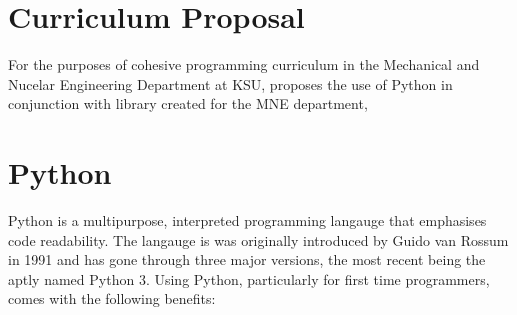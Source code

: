 \section{Curriculum Proposal}

For the purposes of cohesive programming curriculum in the Mechanical and Nucelar Engineering Department 
at KSU, proposes the use of Python in conjunction with library created for the MNE department, 

\section{Python}

Python is a multipurpose, interpreted programming langauge that emphasises code readability. The langauge is
was originally introduced by Guido van Rossum in 1991 and has gone through three major versions,
the most recent being the aptly named Python 3. Using Python, particularly for first time programmers,
comes with the following benefits:

